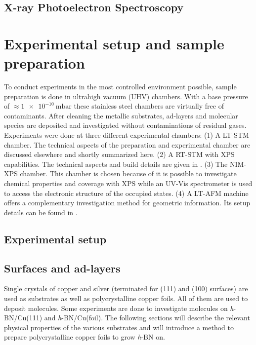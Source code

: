\documentclass[
10pt,					%
a4paper,				%
twoside,				%
BCOR=8mm,				%
headings=normal,		%
headsepline,			%
footsepline,			%
plainfootsepline,		%
]{scrbook}
\begin{document}
  \section{\textbf{X}-ray \textbf{P}hotoelectron \textbf{S}pectroscopy}
	

\chapter{Experimental setup and sample preparation}
To conduct experiments in the most controlled environment possible, sample preparation is done in ultrahigh vacuum (UHV) chambers. With a base pressure of $\approx \SI{1e-10}{\milli \bar}$ these stainless steel chambers are virtually free of contaminants. After cleaning the metallic substrates, ad-layers and molecular species are deposited and investigated without contaminations of residual gases.  Experiments were done at three different experimental chambers: (1) A LT-STM chamber. The technical aspects of the preparation and experimental chamber are discussed elsewhere \cite{urgel_tendero_two-dimensional_2015, schwarz_assembly_2018, wiengarten_scanning_2015} and shortly summarized here. (2) A RT-STM with XPS capabilities. The technical aspects and build details are given in \cite{schwarz_assembly_2018}. (3) The NIM-XPS chamber. This chamber is chosen because of it is possible to investigate chemical properties and coverage with XPS while an UV-Vis spectrometer is used to access the electronic structure of the occupied states. (4) A LT-AFM machine offers a complementary investigation method for geometric information. Its setup details can be found in \cite{he_bottom-up_2017}.

  \section{Experimental setup}
    
  \section{Surfaces and ad-layers}
  Single crystals of copper and silver (terminated for (111) and (100) surfaces) are used as substrates as well as polycrystalline copper foils. All of them are used to deposit molecules. Some experiments are done to investigate molecules on \textit{h}-BN/Cu(111) and \textit{h}-BN/Cu(foil). The following sections will describe the relevant physical properties of the various substrates and will introduce a method to prepare polycrystalline copper foils to grow \textit{h}-BN on.
\end{document}
